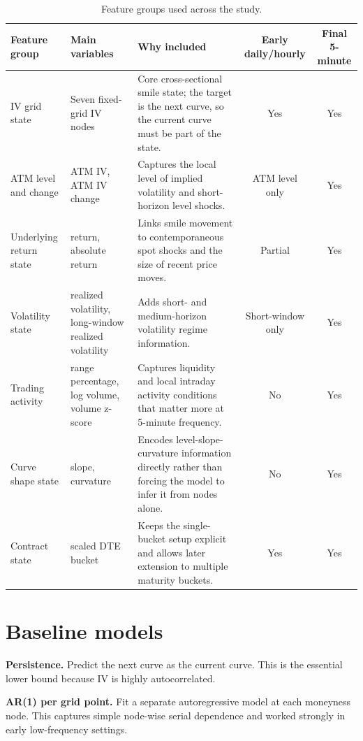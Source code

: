 \documentclass[12pt]{report}
\begin{document}
\begin{table}[H]
\centering
\caption{Feature groups used across the study.}
\label{tab:feature_definitions_main}
\scriptsize
\begin{tabularx}{\textwidth}{p{2.4cm} p{3.4cm} X c c}
\toprule
\textbf{Feature group} & \textbf{Main variables} & \textbf{Why included} & \textbf{Early daily/hourly} & \textbf{Final 5-minute} \\
\midrule
IV grid state & Seven fixed-grid IV nodes & Core cross-sectional smile state; the target is the next curve, so the current curve must be part of the state. & Yes & Yes \\
ATM level and change & ATM IV, ATM IV change & Captures the local level of implied volatility and short-horizon level shocks. & ATM level only & Yes \\
Underlying return state & return, absolute return & Links smile movement to contemporaneous spot shocks and the size of recent price moves. & Partial & Yes \\
Volatility state & realized volatility, long-window realized volatility & Adds short- and medium-horizon volatility regime information. & Short-window only & Yes \\
Trading activity & range percentage, log volume, volume z-score & Captures liquidity and local intraday activity conditions that matter more at 5-minute frequency. & No & Yes \\
Curve shape state & slope, curvature & Encodes level-slope-curvature information directly rather than forcing the model to infer it from nodes alone. & No & Yes \\
Contract state & scaled DTE bucket & Keeps the single-bucket setup explicit and allows later extension to multiple maturity buckets. & Yes & Yes \\
\bottomrule
\end{tabularx}
\end{table}

\section{Baseline models}
\textbf{Persistence.} Predict the next curve as the current curve. This is the essential lower bound because IV is highly autocorrelated.

\textbf{AR(1) per grid point.} Fit a separate autoregressive model at each moneyness node. This captures simple node-wise serial dependence and worked strongly in early low-frequency settings.
\end{document}
